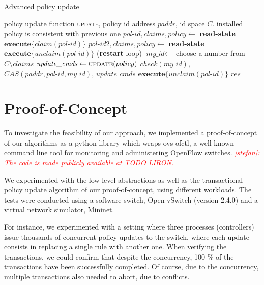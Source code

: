 \documentclass[conference]{sigcomm-alternate}
\newcommand{\claimcheck}{check\xspace}
\newcommand{\paddr}{\textit{paddr}\xspace}
\newcommand{\pid}{\textit{pol-id}\xspace}
\newcommand{\ufunc}{update} %
\newcommand{\stefan}[1]{\textit{\textcolor{red}{[stefan]: #1}}} %
\newcommand{\ack}{\textit{ack}}
\begin{document}
{\small
\begin{algorithm}[t]
    \caption{Advanced policy update}
    \label{alg:update}
    \begin{algorithmic}[1]
        \Require policy update function \textsc{\ufunc}, policy id address $\paddr$, id space $C$.
    \Ensure installed policy is consistent with previous one
 		\Repeat
		 	\State $\pid,claims,policy\gets$ \textbf{read-state} \label{update:read-state1} %
 			\State $\textbf{execute}\{claim(\pid)\}$
 			\State $\pid 2,\textit{claims},\textit{policy}\gets$ \textbf{read-state} \label{update:read-state2} %
 			\If {$\pid\neq \pid 2$}
	 			\State $\textbf{execute} \{\textit{unclaim}(\pid)\}$
 				 (\textbf{restart} loop)
 			\EndIf
 			\State $\textit{my\_id}\gets$ choose a number from $C\setminus claims$
 			\State $\textit{update\_cmds}\gets \textsc{\ufunc}(policy)$ \label{update:compute}
 			\startTxn
 				\State $\claimcheck(my\_id)$,
	 			\State $CAS(\paddr, \pid,my\_id)$,
	 			\State $\textit{update\_cmds}$ %
 			\endTxn
	 		\State $\textbf{execute} \{\textit{unclaim}(\pid)\}$
     	\Until{$res=\ack$}
			\Return $\textit{res}$

    \end{algorithmic}
\end{algorithm}
}


\section{Proof-of-Concept}

To investigate the feasibility of our approach,
we implemented a proof-of-concept of our algorithms
as a python library which wraps ovs-ofctl, 
a well-known command line tool for monitoring and administering OpenFlow switches. 
\stefan{The code is made publicly available at TODO LIRON.}

We experimented with the low-level abstractions as well as the 
transactional policy update algorithm of our proof-of-concept, using
different workloads. 
The tests were conducted using a software switch, Open vSwitch (version 2.4.0) and
a virtual network simulator, Mininet.

For instance, we experimented with a setting where three processes
(controllers) issue thousands of concurrent policy updates
to the switch, where 
each update consists in replacing a single rule with another one.
When verifying the transactions, we could confirm that 
despite the concurrency, 100 \% of the transactions have been successfully completed.
Of course, due to the concurrency, multiple transactions also needed to abort,
due to conflicts. 
 
\end{document}
